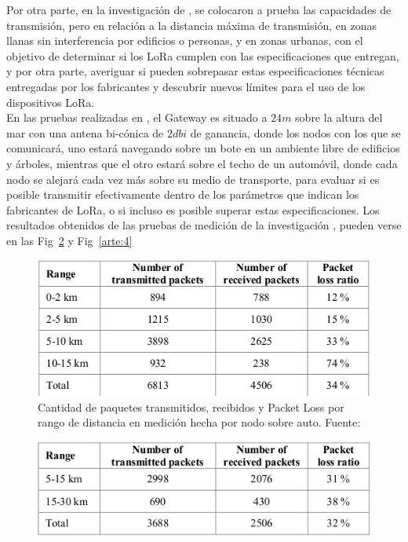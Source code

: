 \begin{justify}
\begin{figure}[!ht]
\label{arte:2}
\end{figure}
Por otra parte, en la investigación de \cite{Juha}, se colocaron a prueba las capacidades de transmisión, pero en relación a la distancia máxima de transmisión, en zonas llanas sin interferencia por edificios o personas, y en zonas urbanas, con el objetivo de determinar si los LoRa cumplen con las especificaciones que entregan, y por otra parte, averiguar si pueden sobrepasar estas especificaciones técnicas entregadas por los fabricantes y descubrir nuevos límites para el uso de los dispositivos LoRa.\\
En las pruebas realizadas en \cite{Juha}, el Gateway es situado a $24m$ sobre la altura del mar con una antena bi-cónica de $2dbi$ de ganancia, donde los nodos con los que se comunicará, uno estará navegando sobre un bote en un ambiente libre de edificios y árboles, mientras que el otro estará sobre el techo de un automóvil, donde cada nodo se alejará cada vez más sobre su medio de transporte, para evaluar si es posible transmitir efectivamente dentro de los parámetros que indican los fabricantes de LoRa, o si incluso es posible superar estas especificaciones. Los resultados obtenidos de las pruebas de medición de la investigación \cite{Juha}, pueden verse en las Fig~\ref{arte:3} y Fig~\ref{arte:4}\\
\begin{figure}[!ht]
\centering
\includegraphics[scale=0.6]{images/estadoarte3}
\caption{Cantidad de paquetes transmitidos, recibidos y Packet Loss por rango de distancia en medición hecha por nodo sobre auto. Fuente:\cite{Juha}}
\label{arte:3}
\end{figure}
\begin{figure}[!ht]
\centering
\includegraphics[scale=0.6]{images/estadoarte4}

\end{figure}
\end{justify}
